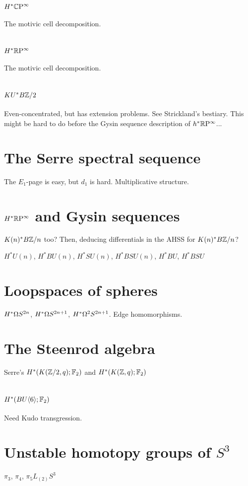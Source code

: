 \section{$H^* \mathbb{C}\mathrm{P}^\infty$}

The motivic cell decomposition.

\section{$H^* \mathbb{R}\mathrm{P}^\infty$}

The motivic cell decomposition.

\section{$KU^* B\mathbb{Z}/2$}

Even-concentrated, but has extension problems.  See Strickland's bestiary.  This might be hard to do before the Gysin sequence description of $h^* \mathbb{R}\mathrm{P}^\infty$...

\section{The Serre spectral sequence}

The $E_1$-page is easy, but $d_1$ is hard.  Multiplicative structure.



\section{$H^* \mathbb{R}\mathrm{P}^\infty$ and Gysin sequences}

$K(n)^* B\mathbb{Z}/n$ too?  Then, deducing differentials in the AHSS for $K(n)^* B\mathbb{Z}/n$?



$H^* U(n)$, $H^* BU(n)$, $H^* SU(n)$, $H^* BSU(n)$, $H^* BU$, $H^* BSU$

\section{Loopspaces of spheres}

$H^* \Omega S^{2n}$, $H^* \Omega S^{2n+1}$, $H^* \Omega^2 S^{2n+1}$.  Edge homomorphisms.

\section{The Steenrod algebra}

Serre's $H^*(K(\mathbb{Z}/2, q); \mathbb{F}_2)$ and $H^*(K(\mathbb{Z}, q); \mathbb{F}_2)$

\section{$H^*(BU\langle6\rangle; \mathbb{F}_2)$}

Need Kudo transgression.

\section{Unstable homotopy groups of $S^3$}

$\pi_3$, $\pi_4$, $\pi_5 L_{(2)} S^3$